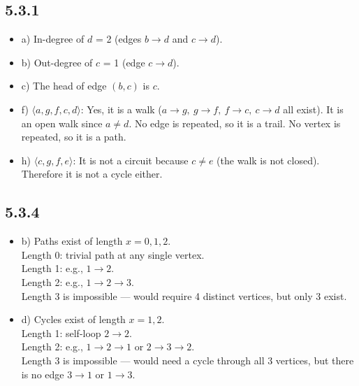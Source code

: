 \documentclass{article}
\begin{document}
\subsection*{5.3.1}
\begin{itemize}
    \item a) In-degree of $d$ = 2 (edges $b \to d$ and $c \to d$).
    \item b) Out-degree of $c$ = 1 (edge $c \to d$).
    \item c) The head of edge $(b, c)$ is $c$.
    \item f) $\langle a, g, f, c, d \rangle$: Yes, it is a walk ($a \to g,\ g \to f,\ f \to c,\ c \to d$ all exist). It is an open walk since $a \ne d$. No edge is repeated, so it is a trail. No vertex is repeated, so it is a path.
    \item h) $\langle c, g, f, e \rangle$: It is not a circuit because $c \ne e$ (the walk is not closed). Therefore it is not a cycle either.
\end{itemize}

\subsection*{5.3.4}
\begin{itemize}
    \item b) Paths exist of length $x = 0, 1, 2$.\\
    Length 0: trivial path at any single vertex.\\
    Length 1: e.g., $1 \to 2$.\\
    Length 2: e.g., $1 \to 2 \to 3$.\\
    Length 3 is impossible --- would require 4 distinct vertices, but only 3 exist.
    \item d) Cycles exist of length $x = 1, 2$.\\
    Length 1: self-loop $2 \to 2$.\\
    Length 2: e.g., $1 \to 2 \to 1$ or $2 \to 3 \to 2$.\\
    Length 3 is impossible --- would need a cycle through all 3 vertices, but there is no edge $3 \to 1$ or $1 \to 3$.
\end{itemize}
\end{document}

